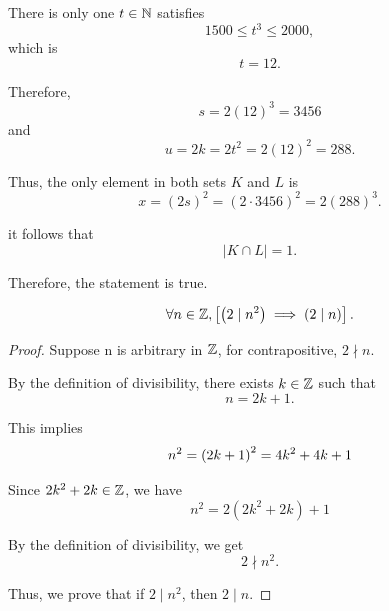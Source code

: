 \begin{enumerate}[label = (\alph*)]
\begin{solution}
There is only one $t \in \mathbb{N}$ satisfies 
\begin{equation*}
    1500 \leq t^3 \leq 2000, 
\end{equation*}
which is
\begin{equation*}
    t = 12.
\end{equation*}

Therefore,
\begin{equation*}
    s = 2(12)^3 = 3456
\end{equation*}
and
\begin{equation*}
    u = 2k = 2t^2 = 2(12)^2 = 288.
\end{equation*}

Thus, the only element in both sets $K$ and $L$ is
\begin{equation*}
    x = (2s)^2 = (2\cdot 3456)^2 = 2(288)^3.
\end{equation*}

it follows that
\begin{equation*}
    |K \cap L| = 1.
\end{equation*}

Therefore, the statement is true.
    \end{solution}
\end{enumerate}

\begin{lemma}
    \begin{equation*}
        \forall n \in \mathbb{Z}, \left[\left(2 \mid n^2\right) \implies \left(2 \mid n\right)\right].
    \end{equation*}
\end{lemma}
\begin{proof}
    Suppose n is arbitrary in $\mathbb{Z}$, for contrapositive, $2 \nmid n$. 

    By the definition of divisibility, there exists $k \in \mathbb{Z}$ such that 
    \begin{equation*}
        n = 2k + 1. 
    \end{equation*}

    This implies 
    \begin{equation*}
        n^2 = \left(2k + 1\right)^2 = 4k^2 + 4k + 1
    \end{equation*}

    Since $2k^2 + 2k \in \mathbb{Z}$, we have 
    \begin{equation*}
        n^2 = 2(2k^2 + 2k) + 1
    \end{equation*}

    By the definition of divisibility, we get 
    \begin{equation*}
        2 \nmid n^2. 
    \end{equation*}

    Thus, we prove that if $2 \mid n^2$, then $2 \mid n$. 
\end{proof}

